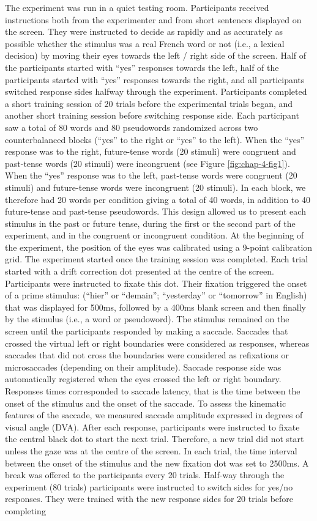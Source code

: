 \documentclass[
  a4paper,12pt,twoside,onecolumn,openright,final,oldfontcommands]{memoir}
\begin{document}
The experiment was run in a quiet testing room. Participants received instructions both from the experimenter and from short sentences displayed on the screen. They were instructed to decide as rapidly and as accurately as possible whether the stimulus was a real French word or not (i.e., a lexical decision) by moving their eyes towards the left / right side of the screen. Half of the participants started with ``yes'' responses towards the left, half of the participants started with ``yes'' responses towards the right, and all participants switched response sides halfway through the experiment. Participants completed a short training session of 20 trials before the experimental trials began, and another short training session before switching response side. Each participant saw a total of 80 words and 80 pseudowords randomized across two counterbalanced blocks (``yes'' to the right or ``yes'' to the left). When the ``yes'' response was to the right, future-tense words (20 stimuli) were congruent and past-tense words (20 stimuli) were incongruent (see Figure \ref{fig:chap-4-fig1}). When the ``yes'' response was to the left, past-tense words were congruent (20 stimuli) and future-tense words were incongruent (20 stimuli). In each block, we therefore had 20 words per condition giving a total of 40 words, in addition to 40 future-tense and past-tense pseudowords. This design allowed us to present each stimulus in the past or future tense, during the first or the second part of the experiment, and in the congruent or incongruent condition. At the beginning of the experiment, the position of the eyes was calibrated using a 9-point calibration grid. The experiment started once the training session was completed. Each trial started with a drift correction dot presented at the centre of the screen. Participants were instructed to fixate this dot. Their fixation triggered the onset of a prime stimulus: (``hier'' or ``demain''; ``yesterday'' or ``tomorrow'' in English) that was displayed for 500ms, followed by a 400ms blank screen and then finally by the stimulus (i.e., a word or pseudoword). The stimulus remained on the screen until the participants responded by making a saccade. Saccades that crossed the virtual left or right boundaries were considered as responses, whereas saccades that did not cross the boundaries were considered as refixations or microsaccades (depending on their amplitude). Saccade response side was automatically registered when the eyes crossed the left or right boundary. Responses times corresponded to saccade latency, that is the time between the onset of the stimulus and the onset of the saccade. To assess the kinematic features of the saccade, we measured saccade amplitude expressed in degrees of visual angle (DVA). After each response, participants were instructed to fixate the central black dot to start the next trial. Therefore, a new trial did not start unless the gaze was at the centre of the screen. In each trial, the time interval between the onset of the stimulus and the new fixation dot was set to 2500ms. A break was offered to the participants every 20 trials. Half-way through the experiment (80 trials) participants were instructed to switch sides for yes/no responses. They were trained with the new response sides for 20 trials before completing 
\end{document}
